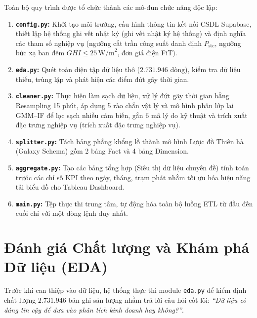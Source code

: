 Toàn bộ quy trình được tổ chức thành các mô-đun chức năng độc lập:
\begin{enumerate}[label=\arabic*., leftmargin=*]
    \item \textbf{\texttt{config.py}:} Khởi tạo môi trường, cấu hình thông tin kết nối CSDL Supabase, thiết lập hệ thống ghi vết nhật ký (ghi vết nhật ký hệ thống) và định nghĩa các tham số nghiệp vụ (ngưỡng cắt trần công suất danh định $P_{\text{stc}}$, ngưỡng bức xạ ban đêm $GHI \le 25\,\text{W/m}^2$, đơn giá điện FiT).
    \item \textbf{\texttt{eda.py}:} Quét toàn diện tập dữ liệu thô ($2.731.946$ dòng), kiểm tra dữ liệu thiếu, trùng lặp và phát hiện các điểm đứt gãy thời gian.
    \item \textbf{\texttt{cleaner.py}:} Thực hiện làm sạch dữ liệu, xử lý đứt gãy thời gian bằng Resampling 15 phút, áp dụng 5 rào chắn vật lý và mô hình phân lớp lai GMM--IF để lọc sạch nhiễu cảm biến, gắn 6 mã lý do kỹ thuật và trích xuất đặc trưng nghiệp vụ (trích xuất đặc trưng nghiệp vụ).
    \item \textbf{\texttt{splitter.py}:} Tách bảng phẳng khổng lồ thành mô hình Lược đồ Thiên hà (Galaxy Schema) gồm 2 bảng Fact và 4 bảng Dimension.
    \item \textbf{\texttt{aggregate.py}:} Tạo các bảng tổng hợp (Siêu thị dữ liệu chuyên đề) tính toán trước các chỉ số KPI theo ngày, tháng, trạm phát nhằm tối ưu hóa hiệu năng tải biểu đồ cho Tableau Dashboard.
    \item \textbf{\texttt{main.py}:} Tệp thực thi trung tâm, tự động hóa toàn bộ luồng ETL từ đầu đến cuối chỉ với một dòng lệnh duy nhất.
\end{enumerate}

\section{Đánh giá Chất lượng và Khám phá Dữ liệu (EDA)}
\label{sec:eda_quality}

Trước khi can thiệp vào dữ liệu, hệ thống thực thi module \texttt{eda.py} để kiểm định chất lượng $2.731.946$ bản ghi sản lượng nhằm trả lời câu hỏi cốt lõi: \textit{``Dữ liệu có đáng tin cậy để đưa vào phân tích kinh doanh hay không?''}.

